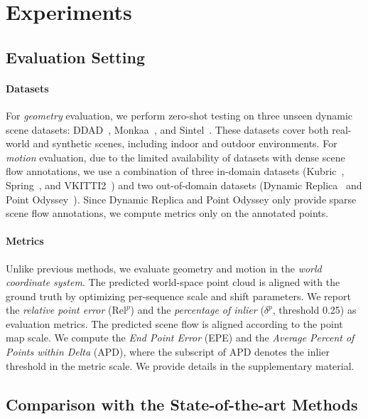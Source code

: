 



\section{Experiments}
\label{sec:experiments}
\subsection{Evaluation Setting}

\paragraph{Datasets}
For \emph{geometry} evaluation, we perform zero-shot testing on three unseen dynamic scene datasets:
DDAD~\cite{ddad2020},
Monkaa~\cite{mayer2016large},
and Sintel~\cite{sintel}. 
These datasets cover both real-world and synthetic scenes,
including indoor and outdoor environments. 
% 
For \emph{motion} evaluation,
due to the limited availability of datasets with dense scene flow annotations,
we use a combination of three in-domain datasets
(Kubric~\cite{greff2021kubric},
Spring~\cite{Mehl2023_Spring},
and VKITTI2~\cite{cabon2020virtual})
and two out-of-domain datasets
(Dynamic Replica~\cite{karaev2023dynamicstereo}
and Point Odyssey~\cite{zheng2023pointodyssey}). 
Since Dynamic Replica and Point Odyssey only provide sparse scene flow annotations,
we compute metrics only on the annotated points.

\paragraph{Metrics}
Unlike previous methods,
we evaluate geometry and motion in the \textit{world coordinate system}.
The predicted world-space point cloud is aligned with the ground truth by optimizing per-sequence scale and shift parameters. 
We report the \textit{relative point error} ($\text{Rel}^p$) and the \textit{percentage of inlier} ($\delta^p$, threshold 0.25) as evaluation metrics. 
% 
The predicted scene flow is aligned according to the point map scale.
We compute the \textit{End Point Error} (EPE) and the \textit{Average Percent of Points within Delta} (APD), 
where the subscript of APD denotes the inlier threshold in the metric scale. 
We provide details in the supplementary material.

\subsection{Comparison with the State-of-the-art Methods}

